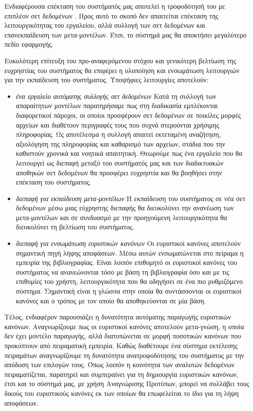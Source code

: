 Ενδιαφέρουσα επέκταση του συστήματός μας αποτελεί η τροφοδότησή του με επιπλέον σετ δεδομένων . Προς αυτό το σκοπό δεν απαιτείται επέκταση της λειτουργικότητας του εργαλείου, αλλά συλλογή των σετ δεδομένων και επανεκπαίδευση των μετα-μοντέλων. Έτσι, το σύστημά μας θα αποκτήσει μεγαλύτερο πεδίο εφαρμογής.

Ευκολότερη επίτευξη του προ-αναφερόμενου στόχου και γενικότερη βελτίωση της ευχρηστίας του συστήματος θα επιφέρει η υλοποίηση και ενσωμάτωση λειτουργιών για την εκπαίδευση του συστήματος. Υποψήφιες λειτουργίες αποτελούν:
\begin{itemize}
	\item \textit{ένα εργαλείο αυτόματης συλλογής σετ δεδομένων} Κατά τη συλλογή των απαραίτητων μοντέλων παρατηρήσαμε πως στη διαδικασία εμπλέκονται διαφορετικοί πάροχοι, οι οποίοι προσφέρουν σετ δεδομένων σε ποικίλες μορφές αρχείων και διαθέτουν περιγραφές τους που συχνά στερούνται χρήσιμης πληροφορίας. Ως αποτέλεσμα η συλλογή απαιτεί εκτεταμένη αναζήτηση, αξιολόγηση της πληροφορίας και καθαρισμό των αρχείων, στάδια που την καθιστούν χρονικά και νοητικά απαιτητική. Θεωρούμε πως ένα εργαλείο που θα λειτουργεί ως διεπαφή μεταξύ του συστήματός μας και των διαδικτυακών αποθηκών σετ δεδομένων θα προσφέρει ευχρηστία και θα βοηθήσει στην επέκταση του συστήματος.
	\item \textit{διεπαφή για εκπαίδευση μετα-μοντέλων} Η εκπαίδευση του συστήματος σε νέα σετ δεδομένων μέσω μιας εύχρηστης διεπαφής θα διευκολύνει την ανανέωση των μετα-μοντέλων και σε συνδυασμό με την προηγούμενη λειτουργικότητα θα διευκολύνει τη βελτίωση του συστήματος.
	\item \textit{διεπαφή για ενσωμάτωση ευριστικών κανόνων} Οι ευριστικοί κανόνες αποτελούν σημαντική πηγή λήψης αποφάσεων. Μέσω αυτών ενσωματώνεται στο πείραμα η εμπειρία της βιβλιογραφίας. Είναι λοιπόν επιθυμητό οι ευριστικοί κανόνες του συστήματος να ανανεώνονται τόσο με βάση τη βιβλιογραφία όσο και με τις επιθυμίες του χρήστη, λειτουργικότητα που θα οδηγήσει σε ένα πιο ρυθμιζόμενο σύστημα. Σημαντική είναι η γλώσσα στην οποία θα συντάσσονται οι ευριστικοί κανόνες και ο τρόπος με τον οποίο θα αποθηκεύονται σε μία βάση. 
\end{itemize}

Τέλος, ενδιαφέρον παρουσιάζει η δυνατότητα αυτόματης παραγωγής ευριστικών κανόνων. Αναγνωρίζουμε πως οι ευριστικοί κανόνες αποτελούν μετα-γνώση, η οποία δεν έχει μοντέλο παραγωγής, αλλά διατυπώνεται σε μορφή ποσοτικών κανόνων που προκύπτουν από πειραματική εμπειρία. Καθώς διαθέτουμε ένα σύστημα εκτέλεσης πειραμάτων αναγνωρίζουμε τη δυνατότητα ανατροφοδότησης του συστήματος με την απόδοση των επιλογών τους. Όπως λοιπόν η κοινότητα των αναλυτών δεδομένων πειραματίζεται, παρατηρεί και συμπεραίνει για τη δημιουργία ευριστικών κανόνων, έτσι και το σύστημά μας, με χρήση Αναγνώρισης Προτύπων, μπορεί να συλλάβει τους δικούς του ευριστικούς κανόνες εκ των οποίων θα επωφελείται το ίδιο για τη λήψη αποφάσεων. 